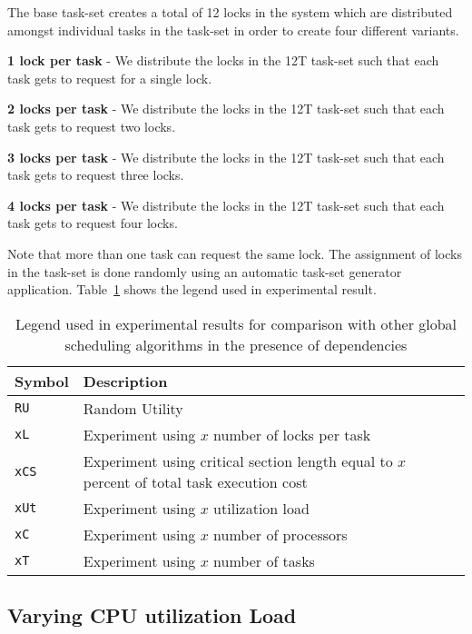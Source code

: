 \documentclass[12pt,dvips]{report}
\begin{document}
The base task-set creates a total of 12 locks in the system which are distributed amongst individual tasks in the task-set in order to create four different variants.
\begin{description}
\item \textbf{1 lock per task} - We distribute the locks in the 12T task-set such that each task gets to request for a single lock.
\item \textbf{2 locks per task} - We distribute the locks in the 12T task-set such that each task gets to request two locks. \item \textbf{3 locks per task} - We distribute the locks in the 12T task-set such that each task gets to request three locks.
\item \textbf{4 locks per task} - We distribute the locks in the 12T task-set such that each task gets  to request four locks.
\end{description}

Note that more than one task can request the same lock. The assignment of locks in the task-set is done randomly using an automatic task-set generator application. Table~\ref{tab:depend-legend} shows the legend used in experimental result.

\begin{table} [!htb]
\caption{Legend used in experimental results for comparison with other global scheduling algorithms in the presence of dependencies}
\label{tab:depend-legend}
\begin{center}
\begin{tabular}{>{\centering}p{3cm} p{10cm}}
\hline
Symbol & Description \\ \hline
\texttt{RU} & Random Utility\\
\texttt{xL} & Experiment using $x$ number of locks per task \\
\texttt{xCS} & Experiment using critical section length equal to $x$ percent of total task execution cost \\
\texttt{xUt} & Experiment using $x$ utilization load \\
\texttt{xC} & Experiment using $x$ number of processors \\
\texttt{xT} & Experiment using $x$ number of tasks \\
\hline
\end{tabular}
\end{center}
\end{table}

\subsection{Varying CPU utilization Load}\label{sec:vary-cpu}
\end{document}
